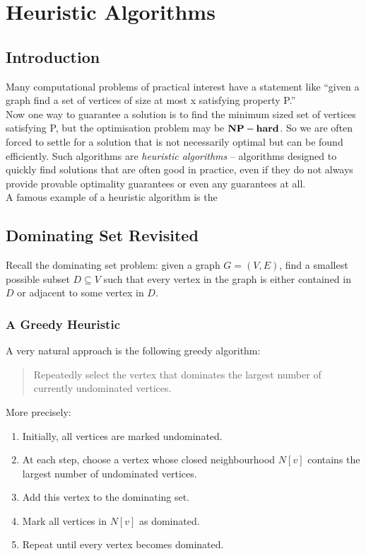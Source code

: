 
\chapter{Heuristic Algorithms}

\section{Introduction}
Many computational problems of practical interest have a statement like ``given a graph find a set of 
vertices of size at most x satisfying property P.'' \\


Now one way to guarantee a solution is to find the minimum sized set of vertices satisfying P, but 
the optimisation problem may be $\mathbf{NP-hard}$. So we are often forced to settle for a solution 
that is not necessarily optimal but can be found efficiently. Such algorithms are 
\emph{heuristic algorithms} -- algorithms designed to quickly find solutions that 
are often good in practice, even if they do not always provide provable optimality guarantees or 
even any guarantees at all. \\ 


A famous example of a heuristic algorithm is the 
\section{Dominating Set Revisited}

Recall the dominating set problem: given a graph \(G=(V,E)\), find a smallest possible subset \(D\subseteq V\) such that every vertex in the graph is either contained in \(D\) or adjacent to some vertex in \(D\).
\subsection*{A Greedy Heuristic}

A very natural approach is the following greedy algorithm:

\begin{quote}
Repeatedly select the vertex that dominates the largest number of currently undominated vertices.
\end{quote}

More precisely:
\begin{enumerate}
    \item Initially, all vertices are marked undominated.
    \item At each step, choose a vertex whose closed neighbourhood \(N[v]\) contains the largest number of undominated vertices.
    \item Add this vertex to the dominating set.
    \item Mark all vertices in \(N[v]\) as dominated.
    \item Repeat until every vertex becomes dominated.
\end{enumerate}

